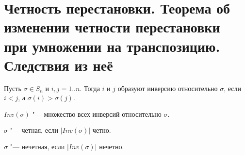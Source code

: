 \section{Четность перестановки. Теорема об изменении четности перестановки при умножении на транспозицию. Следствия из неё}

\begin{Def}
Пусть $\sigma \in S_n$ и $i, j = 1..n$. Тогда $i$ и $j$ образуют инверсию относительно $\sigma$, если $i < j$, а $\sigma(i) > \sigma(j)$.
\end{Def}
\begin{Def}
$Inv(\sigma)$ "--- множество всех инверсий относительно $\sigma$.
\end{Def}
\begin{Def}
$\sigma$ "--- четная, если $|Inv(\sigma)|$ четно.
\end{Def}
\begin{Def}
$\sigma$ "--- нечетная, если $|Inv(\sigma)|$ нечетно.
\end{Def}

